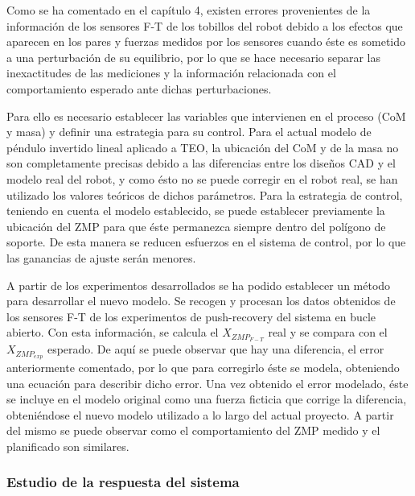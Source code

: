 Como se ha comentado en el capítulo 4, existen errores provenientes de la información de los sensores F-T de los tobillos del robot debido a los efectos que aparecen en los pares y fuerzas medidos por los sensores cuando éste es sometido a una perturbación de su equilibrio, por lo que se hace necesario separar las inexactitudes de las mediciones y la información relacionada con el comportamiento esperado ante dichas perturbaciones.

Para ello es necesario establecer las variables que intervienen en el proceso (CoM y masa) y definir una estrategia para su control. Para el actual modelo de péndulo invertido lineal aplicado a TEO, la ubicación del CoM y de la masa no son completamente precisas debido a las diferencias entre los diseños CAD y el modelo real del robot, y como ésto no se puede corregir en el robot real, se han utilizado los valores teóricos de dichos parámetros. Para la estrategia de control, teniendo en cuenta el modelo establecido, se puede establecer previamente la ubicación del ZMP para que éste permanezca siempre dentro del polígono de soporte. De esta manera se reducen esfuerzos en el sistema de control, por lo que las ganancias de ajuste serán menores.

A partir de los experimentos desarrollados se ha podido establecer un método para desarrollar el nuevo modelo. Se recogen y procesan los datos obtenidos de los sensores F-T de los experimentos de push-recovery del sistema en bucle abierto. Con esta información, se calcula el $X_{ZMP_{F-T}}$ real y se compara con el $X_{ZMP_{exp}}$ esperado. De aquí se puede observar que hay una diferencia, el error anteriormente comentado, por lo que para corregirlo éste se modela, obteniendo una ecuación para describir dicho error. Una vez obtenido el error modelado, éste se incluye en el modelo original como una fuerza ficticia que corrige la diferencia, obteniéndose el nuevo modelo utilizado a lo largo del actual proyecto. A partir del mismo se puede observar como el comportamiento del ZMP medido y el planificado son similares.


\subsubsection{Estudio de la respuesta del sistema}

